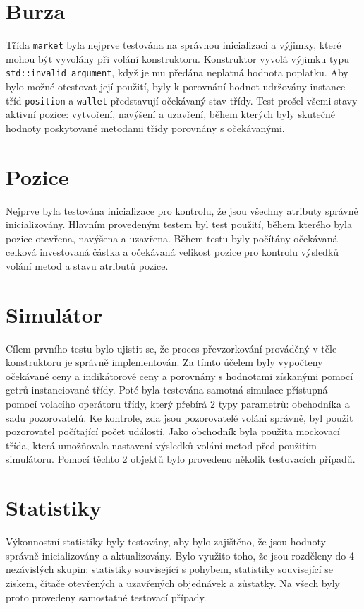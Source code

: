 \section{Burza}
Třída \texttt{market} byla nejprve testována na správnou inicializaci a výjimky, které mohou být vyvolány při volání konstruktoru.
Konstruktor vyvolá výjimku typu \texttt{std::invalid\_argument}, když je mu předána neplatná hodnota poplatku.
Aby bylo možné otestovat její použití, byly k porovnání hodnot udržovány instance tříd \texttt{position} a \texttt{wallet} představují očekávaný stav třídy.
Test prošel všemi stavy aktivní pozice: vytvoření, navýšení a uzavření, během kterých byly skutečné hodnoty poskytované metodami třídy porovnány s očekávanými.

\section{Pozice}
Nejprve byla testována inicializace pro kontrolu, že jsou všechny atributy správně inicializovány.
Hlavním provedeným testem byl test použití, během kterého byla pozice otevřena, navýšena a uzavřena.
Během testu byly počítány očekávaná celková investovaná částka a očekávaná velikost pozice pro kontrolu výsledků volání metod a stavu atributů pozice.

\section{Simulátor}
Cílem prvního testu bylo ujistit se, že proces převzorkování prováděný v těle konstruktoru je správně implementován.
Za tímto účelem byly vypočteny očekávané ceny a indikátorové ceny a porovnány s hodnotami získanými pomocí getrů instanciované třídy.
Poté byla testována samotná simulace přístupná pomocí volacího operátoru třídy, který přebírá 2 typy parametrů: obchodníka a sadu pozorovatelů.
Ke kontrole, zda jsou pozorovatelé voláni správně, byl použit pozorovatel počítající počet událostí.
Jako obchodník byla použita mockovací třída, která umožňovala nastavení výsledků volání metod před použitím simulátoru.
Pomocí těchto 2 objektů bylo provedeno několik testovacích případů.

\section{Statistiky}
Výkonnostní statistiky byly testovány, aby bylo zajištěno, že jsou hodnoty správně inicializovány a aktualizovány.
Bylo využito toho, že jsou rozděleny do 4 nezávislých skupin: statistiky související s pohybem, statistiky související se ziskem, čítače otevřených a uzavřených objednávek a zůstatky.
Na všech byly proto provedeny samostatné testovací případy.

